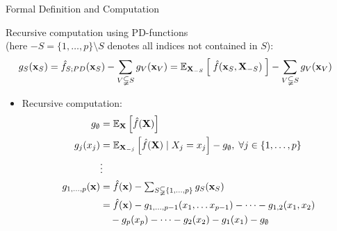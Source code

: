 \documentclass[10pt,compress,t,notes=noshow, xcolor=table]{beamer}
\newcommand{\open}{}
\newcommand{\close}{}
\newcommand{\Xv}{\mathbf{X}} %
\begin{document}
\begin{frame}{Formal Definition and Computation
}

\begin{definition}
    Recursive computation using PD-functions \\
    (here $-S = \{1, \ldots, p \} \setminus S$ denotes all indices not contained in \(S\)):
    \begin{align*}
    g_{S}(\xv_S)
        & = \fh_{S;PD}(\xv_S) - \sum_{V \subsetneqq S} g_V(\xv_V)
        = \mathbb{E}_{\Xv_{-S}} \left[ \; \fh(\xv_S, \Xv_{-S}) \; \right] - \sum_{V \subsetneqq S} g_V(\xv_V)
    \end{align*}
\end{definition}

\begin{itemize}
    \item Recursive computation:
    \begin{align*}
        g_{\open \emptyset \close} &= \mathbb{E}_\Xv\left[\fh(\Xv)\right] \\
        g_{\open j \close}(x_j) &= \mathbb{E}_{\Xv_{-j}}\left[\fh(\Xv) \; \vert  \; X_j = x_j \right] - g_{\open \emptyset \close}, \; \forall j \in \{1, \ldots, p\} \\%
        & \vdots \\
        g_{\open 1, \dots, p \close}(\xv)
        & = \fh(\xv) -
        \textstyle\sum_{S \subsetneqq \{1,\ldots,p\}} g_{S}(\xv_S) \\
        & = \fh(\xv) -
        g_{\open 1, \dots, p-1 \close}(x_{1}, \dots x_{p-1}) - \dots - g_{\open 1, 2 \close}(x_1, x_2) \\
        & \quad - g_{\open p \close}(x_p)  - \dots - g_{\open 2 \close}(x_2) - g_{\open 1 \close}(x_1) - g_{\open \emptyset \close}
    \end{align*}

\end{itemize}
        
\end{frame}
\end{document}
